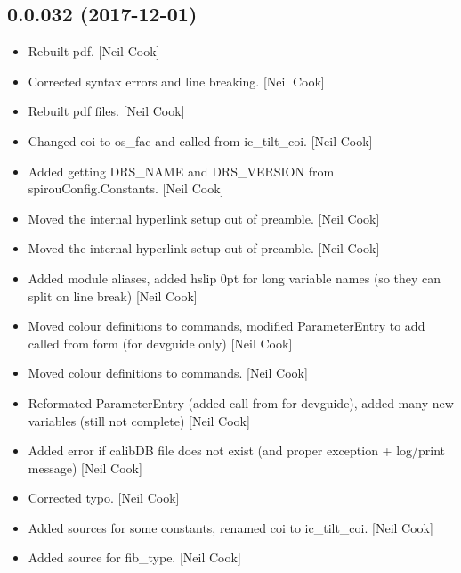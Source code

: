 \documentclass[a4paper,10pt,english]{report}
\begin{document}
\subsection{0.0.032 (2017-12-01)}
\label{\detokenize{misc/changelog:id518}}\begin{itemize}
\item {} 
Rebuilt pdf. {[}Neil Cook{]}

\item {} 
Corrected syntax errors and line breaking. {[}Neil Cook{]}

\item {} 
Rebuilt pdf files. {[}Neil Cook{]}

\item {} 
Changed coi to os\_fac and called from ic\_tilt\_coi. {[}Neil Cook{]}

\item {} 
Added getting DRS\_NAME and DRS\_VERSION from spirouConfig.Constants.
{[}Neil Cook{]}

\item {} 
Moved the internal hyperlink setup out of preamble. {[}Neil Cook{]}

\item {} 
Moved the internal hyperlink setup out of preamble. {[}Neil Cook{]}

\item {} 
Added module aliases, added hslip 0pt for long variable names (so they
can split on line break) {[}Neil Cook{]}

\item {} 
Moved colour definitions to commands, modified ParameterEntry to add
called from form (for devguide only) {[}Neil Cook{]}

\item {} 
Moved colour definitions to commands. {[}Neil Cook{]}

\item {} 
Reformated ParameterEntry (added call from for devguide), added many
new variables (still not complete) {[}Neil Cook{]}

\item {} 
Added error if calibDB file does not exist (and proper exception +
log/print message) {[}Neil Cook{]}

\item {} 
Corrected typo. {[}Neil Cook{]}

\item {} 
Added sources for some constants, renamed coi to ic\_tilt\_coi. {[}Neil
Cook{]}

\item {} 
Added source for fib\_type. {[}Neil Cook{]}

\end{itemize}
\end{document}
